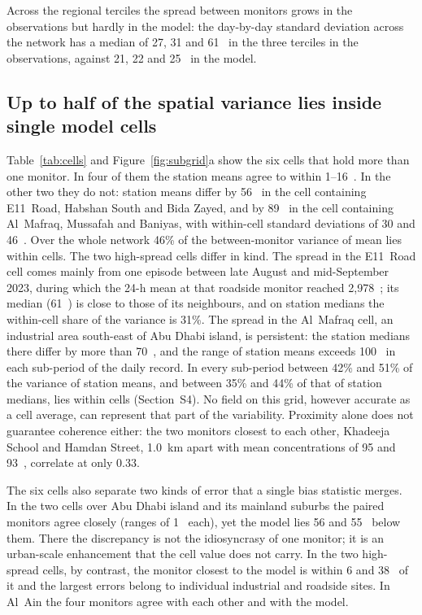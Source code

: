 Across the regional terciles the spread between monitors grows in the observations but hardly
in the model: the day-by-day standard deviation across the network has a median of 27, 31 and
61~\ugm{} in the three terciles in the observations, against 21, 22 and 25~\ugm{} in the model.

\subsection{Up to half of the spatial variance lies inside single model cells}
\label{sec:res-subgrid}

Table~\ref{tab:cells} and Figure~\ref{fig:subgrid}a show the six cells that hold more than one
monitor. In four of them the station means agree to within 1--16~\ugm{}. In the other two they do
not: station means differ by 56~\ugm{} in the cell containing E11~Road, Habshan South and Bida
Zayed, and by 89~\ugm{} in the cell containing Al~Mafraq, Mussafah and Baniyas, with within-cell
standard deviations of 30 and 46~\ugm{}. Over the whole network 46\% of the between-monitor
variance of mean \pmten{} lies within cells. The two high-spread cells differ in kind. The spread
in the E11~Road cell comes mainly from one episode between late August and mid-September 2023,
during which the 24-h mean at that roadside monitor reached 2,978~\ugm{}; its median (61~\ugm{})
is close to those of its neighbours, and on station medians the within-cell share of the variance
is 31\%. The spread in the Al~Mafraq cell, an industrial area south-east of Abu Dhabi island, is
persistent: the station medians there differ by more than 70~\ugm{}, and the range of station
means exceeds 100~\ugm{} in each sub-period of the daily record. In every sub-period between 42\%
and 51\% of the variance of station means, and between 35\% and 44\% of that of station medians,
lies within cells (Section~S4). No field on this grid, however accurate as a cell average, can
represent that part of the variability. Proximity alone does not guarantee coherence either: the two monitors
closest to each other, Khadeeja School and Hamdan Street, 1.0~km apart with mean concentrations of
95 and 93~\ugm{}, correlate at only 0.33.

The six cells also separate two kinds of error that a single bias statistic merges. In the two
cells over Abu Dhabi island and its mainland suburbs the paired monitors agree closely (ranges of
1~\ugm{} each), yet the model lies 56 and 55~\ugm{} below them. There the discrepancy is not the
idiosyncrasy of one monitor; it is an urban-scale enhancement that the cell value does not carry.
In the two high-spread cells, by contrast, the monitor closest to the model is within 6 and
38~\ugm{} of it and the largest errors belong to individual industrial and roadside sites. In
Al~Ain the four monitors agree with each other and with the model.

